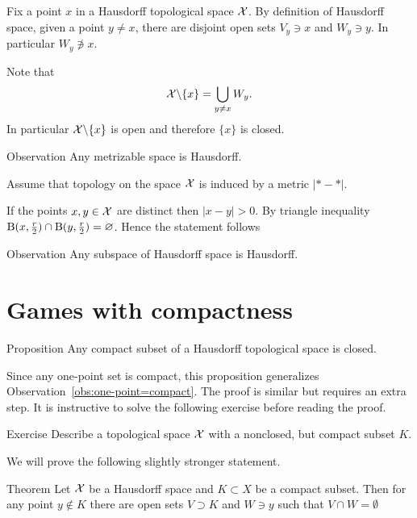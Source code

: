 Fix a point $x$ in a Hausdorff topological space $\mathcal{X}$.
By definition of Hausdorff space, given a point $y\ne x$,
there are disjoint open sets $V_y\ni x$ and $W_y\ni y$.
In particular $W_y\not\ni x$.

Note that 
\[\mathcal{X}\backslash\{x\}=\bigcup_{y\ne x}W_y.\]
In particular $\mathcal{X}\backslash\{x\}$ is open and therefore $\{x\}$ is closed.
\qeds

\begin{thm}{Observation}
Any metrizable space is Hausdorff.
\end{thm}

Assume that topology on the space $\mathcal{X}$ is induced by a metric $|{*}-{*}|$.

If the points $x,y\in\mathcal{X}$ are distinct then $|x-y|>0$.
By triangle inequality 
$\mathrm{B}(x,\tfrac r2)\cap \mathrm{B}(y,\tfrac r2)=\varnothing$.
Hence the statement follows
\qeds


\begin{thm}{Observation}
Any subspace of Hausdorff space is Hausdorff.
\end{thm}



\section{Games with compactness}

\begin{thm}{Proposition}\label{prop:hausdorff-compact-closed}
Any compact  subset of a Hausdorff topological space is closed. 
\end{thm}

Since any one-point set is compact, this proposition generalizes Observation~\ref{obs:one-point=compact}.
The proof is similar but requires an extra step.
It is instructive to solve the following exercise before reading the proof.

\begin{thm}{Exercise}
Describe a topological space $\mathcal{X}$ with a nonclosed, but compact subset $K$. 
\end{thm}

We will prove the following slightly stronger statement.

\begin{thm}{Theorem}\label{thm:hausdorff-compact-t3}
Let $\mathcal{X}$ be a Hausdorff space and $K\subset X$ be a compact subset.
Then for any point $y\notin K$ there are open sets $V\supset K$ and $W\ni y$
such that $V\cap W=\emptyset$
\end{thm}

